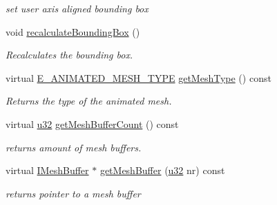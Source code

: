 \begin{DoxyCompactItemize}
\begin{DoxyCompactList}\small\item\em set user axis aligned bounding box \end{DoxyCompactList}\item 
\mbox{\label{structirr_1_1scene_1_1SAnimatedMesh_a95990a26946e43a4bdfbc1edb3ddefbb}} 
void \hyperlink{structirr_1_1scene_1_1SAnimatedMesh_a95990a26946e43a4bdfbc1edb3ddefbb}{recalculate\+Bounding\+Box} ()
\begin{DoxyCompactList}\small\item\em Recalculates the bounding box. \end{DoxyCompactList}\item 
\mbox{\label{structirr_1_1scene_1_1SAnimatedMesh_a423a3a9a7d2075eac53280fdfb15fdc9}} 
virtual \hyperlink{namespaceirr_1_1scene_a2fc85a64604521ca063f1881b5dd1c61}{E\+\_\+\+A\+N\+I\+M\+A\+T\+E\+D\+\_\+\+M\+E\+S\+H\+\_\+\+T\+Y\+PE} \hyperlink{structirr_1_1scene_1_1SAnimatedMesh_a423a3a9a7d2075eac53280fdfb15fdc9}{get\+Mesh\+Type} () const
\begin{DoxyCompactList}\small\item\em Returns the type of the animated mesh. \end{DoxyCompactList}\item 
\mbox{\label{structirr_1_1scene_1_1SAnimatedMesh_a01dd8fd3ea4a53af90599697cd34ea01}} 
virtual \hyperlink{namespaceirr_a0416a53257075833e7002efd0a18e804}{u32} \hyperlink{structirr_1_1scene_1_1SAnimatedMesh_a01dd8fd3ea4a53af90599697cd34ea01}{get\+Mesh\+Buffer\+Count} () const
\begin{DoxyCompactList}\small\item\em returns amount of mesh buffers. \end{DoxyCompactList}\item 
\mbox{\label{structirr_1_1scene_1_1SAnimatedMesh_ac186898d77ded042569a27609195d263}} 
virtual \hyperlink{classirr_1_1scene_1_1IMeshBuffer}{I\+Mesh\+Buffer} $\ast$ \hyperlink{structirr_1_1scene_1_1SAnimatedMesh_ac186898d77ded042569a27609195d263}{get\+Mesh\+Buffer} (\hyperlink{namespaceirr_a0416a53257075833e7002efd0a18e804}{u32} nr) const
\begin{DoxyCompactList}\small\item\em returns pointer to a mesh buffer \end{DoxyCompactList}\item 

\end{DoxyCompactItemize}
